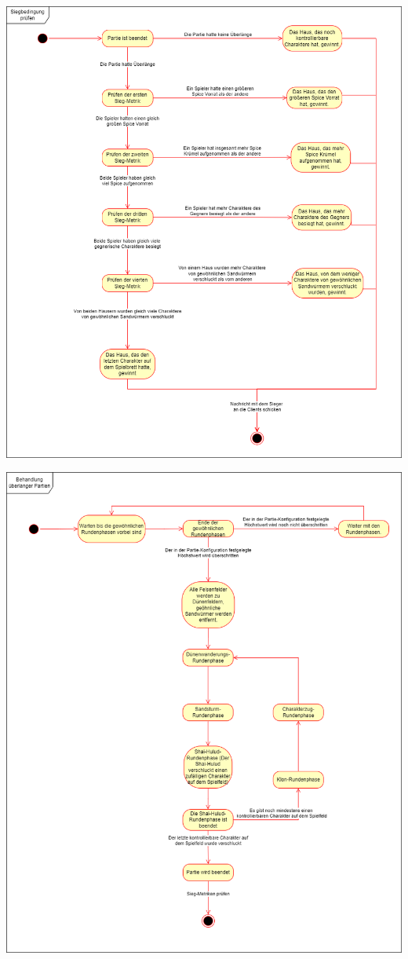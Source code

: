 \documentclass[12pt]{article}
\begin{document}
\includegraphics[width=\textwidth]{images/Siegbedingung_pruefen_Zustandsdiagramm}

\includegraphics[width=\textwidth]{images/Behandlung_ueberlanger_Partien_Zustandsdiagramm}
\end{document}
